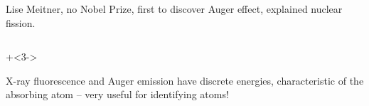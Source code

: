 \begin{frame}
\begin{columns}[T]
\begin{column}{55mm}
\begin{columns}
\begin{column}{40mm}
            {\tiny{Lise Meitner, no Nobel Prize,  first to discover Auger effect, explained nuclear fission}}.

          \end{column}
        \end{columns}

      \end{column}
    \end{columns}

    \onslide+<3->

    \begin{postitbox}{105mm}
        X-ray fluorescence and Auger emission have discrete energies,
        characteristic of the absorbing atom -- very useful for identifying atoms!
      \end{postitbox}

\vfill
\end{frame}
